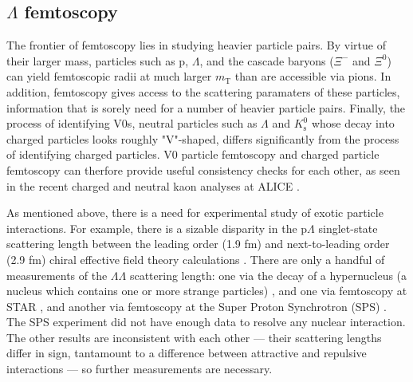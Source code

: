 \subsection{$\Lambda$ femtoscopy}
\label{sec:LambdaFemto}

The frontier of femtoscopy lies in studying heavier particle pairs.
By virtue of their larger mass, particles such as p, $\Lambda$, and the cascade baryons ($\Xi^-$ and $\Xi^0$) can yield femtoscopic radii at much larger $m_\mathrm{T}$ than are accessible via pions.
In addition, femtoscopy gives access to the scattering paramaters of these particles, information that is sorely need for a number of heavier particle pairs.
Finally, the process of identifying V0s, neutral particles such as $\Lambda$ and $K^0_\mathrm{s}$ whose decay into charged particles looks roughly "V"-shaped, differs significantly from the process of identifying charged particles.
V0 particle femtoscopy and charged particle femtoscopy can therfore provide useful consistency checks for each other, as seen in the recent charged and neutral kaon analyses at ALICE \cite{Adam:2015vja}.

As mentioned above, there is a need for experimental study of exotic particle interactions.
For example, there is a sizable disparity in the p$\Lambda$ singlet-state scattering length between the leading order (1.9 fm) and next-to-leading order (2.9 fm) chiral effective field theory calculations \cite{Haidenbauer:2013oca}.
There are only a handful of measurements of the $\Lambda\Lambda$ scattering length: one via the decay of a hypernucleus (a nucleus which contains one or more strange particles) \cite{Takahashi:2001nm,Filikhin:2002wm,Hiyama:2002yj}, and one via femtoscopy at STAR \cite{Adamczyk:2014vca}, and another via femtoscopy at the Super Proton Synchrotron (SPS) \cite{Andersen:1999gq}.
The SPS experiment did not have enough data to resolve any nuclear interaction.
The other results are inconsistent with each other --- their scattering lengths differ in sign, tantamount to a difference between attractive and repulsive interactions --- so further measurements are necessary.

